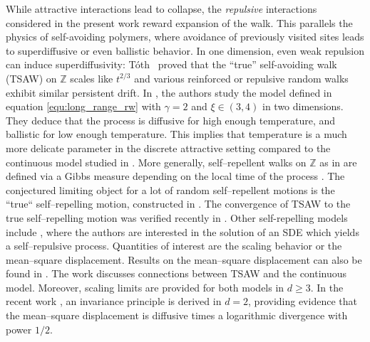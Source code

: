 \documentclass[reqno,11pt]{amsart}
\newcommand{\1}{\mathds{1}}
\theoremstyle{plain}
\theoremstyle{definition}
\numberwithin{equation}{section}
\newcommand{\bbZ}{{\mathbb Z}}
\begin{document}
While attractive interactions lead to collapse, the \emph{repulsive} interactions considered in the present work reward expansion of the walk. This parallels the physics of self-avoiding polymers, where avoidance of previously visited sites leads to superdiffusive or even ballistic behavior. In one dimension, even weak repulsion can induce superdiffusivity: Tóth~\cite{Toth1995} proved that the ``true'' self-avoiding walk (TSAW) on $\mathbb{Z}$ scales like $t^{2/3}$ 
and various reinforced or repulsive random walks exhibit similar persistent drift. 
In \cite{PrSaSc08}, the authors study the model defined in equation \eqref{equ:long_range_rw} with $\gamma=2$ and $\xi \in (3,4)$ in two dimensions. They deduce that the process is diffusive for high enough temperature, and ballistic for low enough temperature. This implies that temperature is a much more delicate parameter in the discrete attractive setting compared to the continuous model studied in \cite{BeSchSe25b}. 
More generally, self--repellent walks on $\bbZ$ as in \cite{Toth1995} are defined via a Gibbs measure depending on the local time of the process \cite{AmPaPe83,ToVe11}. The conjectured limiting object for a lot of random self--repellent motions is the ``true`` self--repelling motion, constructed in \cite{ToWe98}. The convergence of TSAW to the true self--repelling motion was verified recently in \cite{KoPe25}. Other self-repelling models include  \cite{NoRoWi87,DuRo92}, where the authors are interested in the solution of an SDE which yields a self--repulsive process. Quantities of interest are the scaling behavior or the mean--square displacement. Results on the mean--square displacement can also be found in \cite{TaToVa12}. The  work \cite{HoToVe10} discusses connections between TSAW and the continuous model. Moreover, scaling limits are provided for both models in $d \ge 3$. In the recent work \cite{CaGi25}, an invariance principle is derived in $d=2$, providing evidence that the mean--square displacement is diffusive times a logarithmic divergence with power $1/2$.
\end{document}

